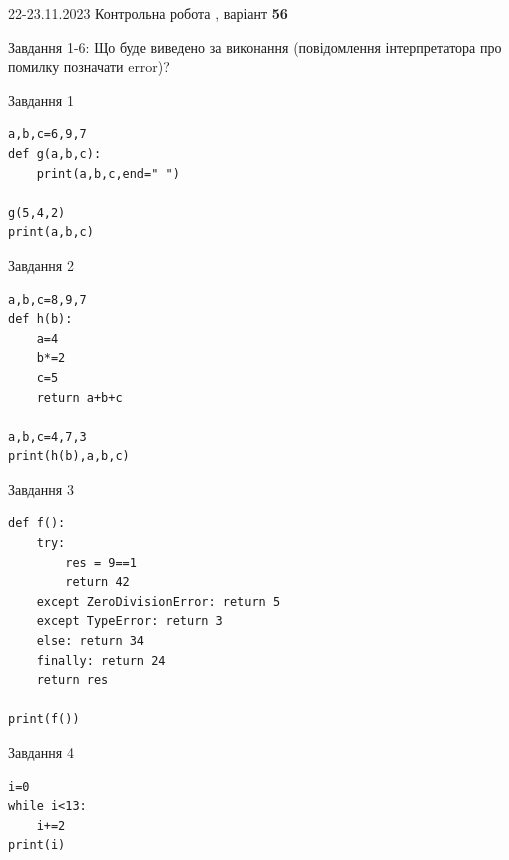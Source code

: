 \documentclass[12pt, ukrainian]{article}
\begin{document}
{{22-23.11.2023 Контрольна робота , варіант  \No \textbf { 56 }\par}}
{

Завдання 1-6: Що буде виведено за виконання (повідомлення інтерпретатора про помилку позначати error)?


\begin{minipage}[t]{9.7cm}                
{\begin{center}Завдання {1}\end{center}}
\begin{verbatim}
a,b,c=6,9,7
def g(a,b,c):
    print(a,b,c,end=" ")

g(5,4,2)
print(a,b,c)
\end{verbatim}     
\end{minipage}
\vline \hspace{8mm}
\begin{minipage}[t]{8.0cm}                
{\begin{center}Завдання {2}\end{center}}
\begin{verbatim}
a,b,c=8,9,7
def h(b):
    a=4
    b*=2
    c=5
    return a+b+c

a,b,c=4,7,3
print(h(b),a,b,c)
\end{verbatim}     
\end{minipage}

\vspace{15mm}
\begin{minipage}[t]{9.7cm}                
{\begin{center}Завдання {3}\end{center}}
\begin{verbatim}
def f():
    try:
        res = 9==1
        return 42
    except ZeroDivisionError: return 5
    except TypeError: return 3
    else: return 34
    finally: return 24
    return res

print(f())
\end{verbatim}     
\end{minipage}
\vline \hspace{8mm}
\begin{minipage}[t]{8.0cm}                
{\begin{center}Завдання {4}\end{center}}
\begin{verbatim}
i=0
while i<13:
    i+=2
print(i)
\end{verbatim}     
\end{minipage}

}
\end{document}
